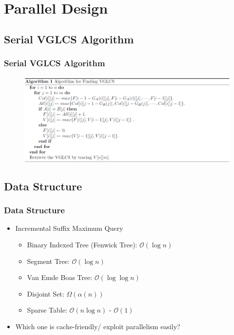 \section{Parallel Design}

\subsection{Serial VGLCS Algorithm}
\begin{frame}
	\frametitle{Serial VGLCS Algorithm}
	\begin{figure}
		\includegraphics[scale=0.3]{figure/fig-VGLCS-algo.png}
	\end{figure}
\end{frame}

\subsection{Data Structure}
\begin{frame}
    \frametitle{Data Structure}
    \begin{itemize}
    \setlength\itemsep{1em}
    	\item Incremental Suffix Maximum Query
    		\begin{itemize}
    			\setlength\itemsep{1em}
    			\item Binary Indexed Tree (Fenwick Tree): $\mathcal{O}(\log n)$
    			\item Segment Tree: $\mathcal{O}(\log n)$
    			\item Van Emde Boas Tree: $\mathcal{O}(\log \log n)$
    			\item Disjoint Set: $\Omega(\alpha(n))$
    			\item Sparse Table: $\mathcal{O}(n \log n)$ - $\mathcal{O}(1)$
    		\end{itemize}
    	\item Which one is cache-friendly/ exploit parallelism easily?
    \end{itemize}
\end{frame}

